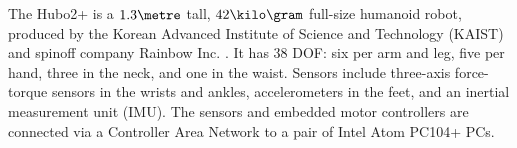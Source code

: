 

The Hubo2+ is a $1.3\meter$ tall, $42 \kilo\gram$ full-size humanoid
robot, produced by the Korean Advanced Institute of Science and
Technology (KAIST) and spinoff company Rainbow Inc. \cite{1573587}.
It has 38 DOF: six per arm and leg, five per hand, three in the neck,
and one in the waist.  Sensors include three-axis force-torque sensors
in the wrists and ankles, accelerometers in the feet, and an inertial
measurement unit (IMU).  The sensors and embedded motor controllers
are connected via a Controller Area Network to a pair of Intel Atom
PC104+ PCs.

